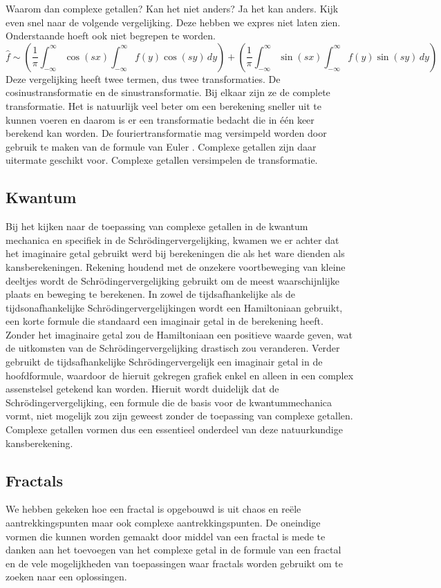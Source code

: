 \documentclass[11pt,fleqn]{book} %
\begin{document}
Waarom dan complexe getallen? Kan het niet anders? Ja het kan anders. Kijk even snel naar de volgende vergelijking. Deze hebben we expres niet laten zien. Onderstaande hoeft ook niet begrepen te worden.
\begin{displaymath}
\hat{f}\sim\left(\frac{1}{\pi}\int_{-\infty}^\infty\cos{(sx)}\int_{-\infty}^\infty f(y)\cos{(sy)}\,dy\right)+\left(\frac{1}{\pi}\int_{-\infty}^\infty\sin{(sx)}\int_{-\infty}^\infty f(y)\sin{(sy)}\,dy\right)
\end{displaymath}
Deze vergelijking heeft twee termen, dus twee transformaties. De cosinustransformatie en de sinustransformatie. Bij elkaar zijn ze de complete transformatie. Het is natuurlijk veel beter om een berekening sneller uit te kunnen voeren en daarom is er een transformatie bedacht die in één keer berekend kan worden. De fouriertransformatie mag versimpeld worden door gebruik te maken van de formule van Euler \cite{jo}. Complexe getallen zijn daar uitermate geschikt voor. Complexe getallen versimpelen de transformatie.

\subsection{Kwantum}
Bij het kijken naar de toepassing van complexe getallen in de kwantum mechanica en specifiek in de Schrödingervergelijking, kwamen we er achter dat het imaginaire getal gebruikt werd bij berekeningen die als het ware dienden als kansberekeningen. Rekening houdend met de onzekere voortbeweging van kleine deeltjes wordt de Schrödingervergelijking gebruikt om de meest waarschijnlijke plaats en beweging te berekenen. 
In zowel de tijdsafhankelijke als de tijdsonafhankelijke Schrödingervergelijkingen wordt een Hamiltoniaan gebruikt, een korte formule die standaard een imaginair getal in de berekening heeft. Zonder het imaginaire getal zou de Hamiltoniaan een positieve waarde geven, wat de uitkomsten van de Schrödingervergelijking drastisch zou veranderen. Verder gebruikt de tijdsafhankelijke Schrödingervergelijk een imaginair getal in de hoofdformule, waardoor de hieruit gekregen grafiek enkel en alleen in een complex assenstelsel getekend kan worden.
Hieruit wordt duidelijk dat de Schrödingervergelijking, een formule die de basis voor de kwantummechanica vormt, niet mogelijk zou zijn geweest zonder de toepassing van complexe getallen. Complexe getallen vormen dus een essentieel onderdeel van deze natuurkundige kansberekening.

\subsection{Fractals}
We hebben gekeken hoe een fractal is opgebouwd is uit chaos en reële aantrekkingspunten maar ook complexe aantrekkingspunten. De oneindige vormen die kunnen worden gemaakt door middel van een fractal is mede te danken aan het toevoegen van het complexe getal in de formule van een fractal en de vele mogelijkheden van toepassingen waar fractals worden gebruikt om te zoeken naar een oplossingen.
\end{document}
